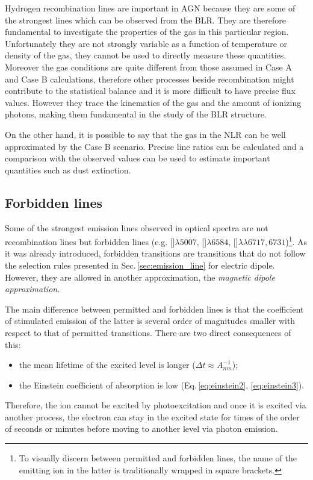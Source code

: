\documentclass[../main.tex]{subfiles}
\begin{document}
Hydrogen recombination lines are important in AGN because they are some of the strongest lines which can be observed from the BLR.
They are therefore fundamental to investigate the properties of the gas in this particular region.
Unfortunately they are not strongly variable as a function of temperature or density of the gas, they cannot be used to directly measure these quantities.
Moreover the gas conditions are quite different from those assumed in Case A and Case B calculations, therefore other processes beside recombination might contribute to the statistical balance and it is more difficult to have precise flux values.
However they trace the kinematics of the gas and the amount of ionizing photons, making them fundamental in the study of the BLR structure.

On the other hand, it is possible to say that the gas in the NLR can be well approximated by the Case B scenario.
Precise line ratios can be calculated and a comparison with the observed values can be used to estimate important quantities such as dust extinction.
 
\subsection{Forbidden lines}
\label{sec:forb_line}

Some of the strongest emission lines observed in optical spectra are not recombination lines but forbidden lines (e.g. []$\lambda5007$, []$\lambda6584$, []$\lambda\lambda6717,6731$)\footnote{To visually discern between permitted and forbidden lines, the name of the emitting ion in the latter is traditionally wrapped in square brackets.}.
As it was already introduced, forbidden transitions are transitions that do not follow the selection rules presented in Sec.\,\ref{sec:emission_line} for electric dipole.
However, they are allowed in another approximation, the \emph{magnetic dipole approximation}.

The main difference between permitted and forbidden lines is that the coefficient of stimulated emission of the latter is several order of magnitudes smaller with respect to that of permitted transitions.
There are two direct consequences of this:
\begin{itemize}
    \item the mean lifetime of the excited level is longer ($\Delta t \approx A_{nm}^{-1}$);
    \item the Einstein coefficient of absorption is low (Eq.\,\ref{eq:einstein2}, \ref{eq:einstein3}).
\end{itemize}
Therefore, the ion cannot be excited by photoexcitation and once it is excited via another process, the electron can stay in the excited state for times of the order of seconds or minutes before moving to another level via photon emission.
\end{document}

